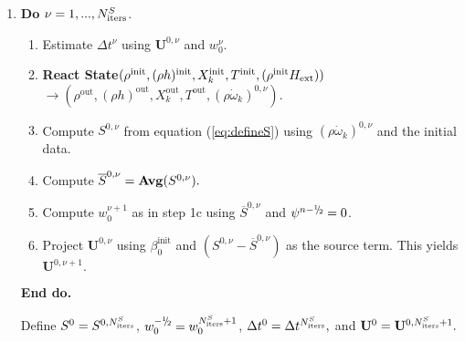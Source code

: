 \documentclass[11pt]{article}
\newcommand{\sfrac}[2]{\mathchoice
  {\kern0em\raise.5ex\hbox{\the\scriptfont0 #1}\kern-.15em/
   \kern-.15em\lower.25ex\hbox{\the\scriptfont0 #2}}
  {\kern0em\raise.5ex\hbox{\the\scriptfont0 #1}\kern-.15em/
   \kern-.15em\lower.25ex\hbox{\the\scriptfont0 #2}}
  {\kern0em\raise.5ex\hbox{\the\scriptscriptfont0 #1}\kern-.2em/
   \kern-.15em\lower.25ex\hbox{\the\scriptscriptfont0 #2}}
  {#1\!/#2}}
\newcommand{\myhalf}{\sfrac{1}{2}}
\newcommand{\nmh}{{n - \myhalf}}
\newcommand{\Hext}{{H_{\rm ext}}}
\newcommand{\initp}{\mathrm{init}}
\newcommand{\outp}{\mathrm{out}}
\newcommand{\dt}{\Delta t}
\newcommand{\ubold}{\mathbf{U}}
\newcommand{\omegadot}{\dot{\omega}}
\begin{document}
\begin{enumerate}
\renewcommand{\theenumi}{{\bf \alph{enumi}}}
\renewcommand{\labelenumii}{\roman{enumii}.}

\item {\bf Do} {$\nu = 1,...,N_{\rm iters}^{S}$.}
  \begin{enumerate}

  \item Estimate $\Delta t^\nu$ using $\ubold^{0,\nu}$ and $w_0^\nu.$

  \item {\bf React State}$( \rho^{\initp},(\rho h)^{\initp}, X_k^{\initp}, T^{\initp}, (\rho^{\initp} \Hext) )$\\
      $\rightarrow (\rho^{\outp}, (\rho h)^{\outp}, X_k^{\outp}, T^{\outp}, (\rho \omegadot_k)^{0,\nu} ).$

  \item Compute $S^{0,\nu}$ from equation (\ref{eq:defineS}) 
        using $(\rho \omegadot_k)^{0,\nu}$ and the initial data.

  \item Compute $\overline{S}^{0,\nu} = {\mathrm{\bf Avg}} (S^{0,\nu}).$

  \item Compute $w_0^{\nu+1}$ as in step 1c using $\overline{S}^{0,\nu}$ and $\psi^{\nmh} = 0$.
        

  \item Project $\ubold^{0,\nu}$ using $\beta_0^{\initp}$ and 
        $(S^{0,\nu} - \overline{S}^{0,\nu})$ as the source term.  
        This yields $\ubold^{0,\nu+1}.$

  \end{enumerate}

  {\bf End do.}

  Define $S^0 = S^{0,N_{\rm iters}^S}$, $w_0^{-\myhalf} = w_0^{N_{\rm iters}^S+1}$, 
$\dt^0 = \Delta t^{N_{\rm iters}^S},$ and $\ubold^0 = \ubold^{0,N_{\rm iters}^S+1}.$

\end{enumerate}
\end{document}
